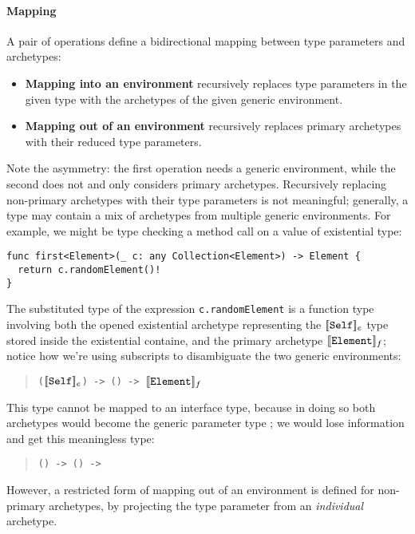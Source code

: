 \documentclass[../generics]{subfiles}
\begin{document}
\paragraph{Mapping}
A pair of operations define a bidirectional mapping between type parameters and archetypes:
\begin{itemize}
\item {}\textbf{Mapping into an environment} recursively replaces type parameters in the given type with the archetypes of the given generic environment.
\item {}\textbf{Mapping out of an environment} recursively replaces primary archetypes with their reduced type parameters.
\end{itemize}
Note the asymmetry: the first operation needs a generic environment, while the second does not and only considers primary archetypes. Recursively replacing non-primary archetypes with their type parameters is not meaningful; generally, a type may contain a mix of archetypes from multiple generic environments. For example, we might be type checking a method call on a value of existential type:
\begin{Verbatim}
func first<Element>(_ c: any Collection<Element>) -> Element {
  return c.randomElement()!
}
\end{Verbatim}
The substituted type of the expression \texttt{c.randomElement} is a function type involving both the opened existential archetype representing the $[\![\texttt{Self}]\!]_e$ type stored inside the existential containe, and the primary archetype $[\![\texttt{Element}]\!]_f$; notice how we're using subscripts to disambiguate the two generic environments:
\begin{quote}
\texttt{($[\![\texttt{Self}]\!]_e$) -> () -> $[\![\texttt{Element}]\!]_f$}
\end{quote}
This type cannot be mapped to an interface type, because in doing so both archetypes would become the generic parameter type ; we would lose information and get this meaningless type:
\begin{quote}
\texttt{() -> () -> }
\end{quote}
However, a restricted form of mapping out of an environment is defined for non-primary archetypes, by projecting the type parameter from an \emph{individual} archetype.
\end{document}
